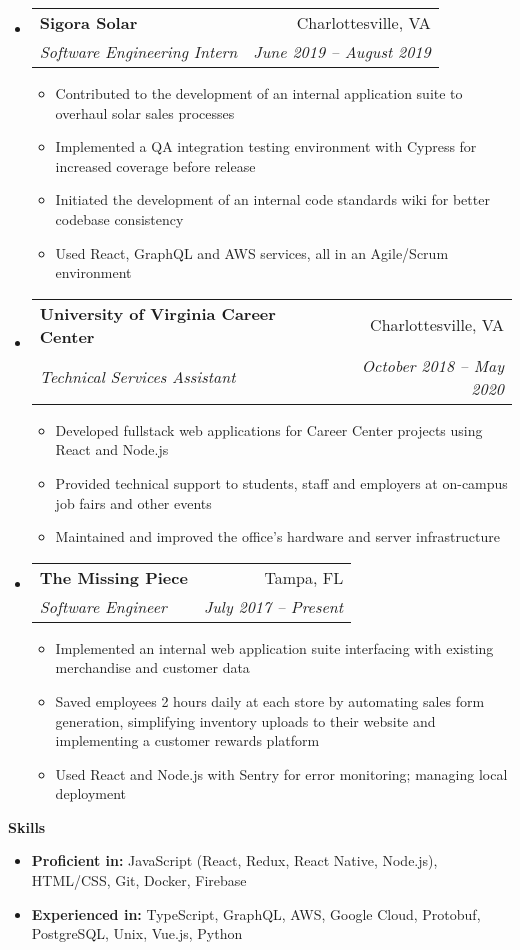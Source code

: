 \documentclass[letterpaper,12pt]{article}[leftmargin=*]
\makeatletter
\def \entryspacing {-0pt}
\renewcommand{\section}[2]{\vspace{5pt}
  \colorbox{secondary}{\color{white}\raggedbottom\normalsize\textbf{{#1}{\hspace{7pt}#2}}}
}
\newcommand{\resumeEntryStart}{\begin{itemize}[leftmargin=2.5mm]}
\newcommand{\resumeEntryEnd}{\end{itemize}\vspace{\entryspacing}}
\newcommand{\resumeItemListStart}{\begin{itemize}[leftmargin=4.5mm]}
\newcommand{\resumeItemListEnd}{\end{itemize}}
\newcommand{\resumeItem}[1]{
  \item\small{
    {#1 \vspace{-2pt}}
  }
}
\newcommand{\resumeEntryTSDL}[4]{
  \vspace{-1pt}\item[]
    \begin{tabular*}{0.97\textwidth}{l@{\extracolsep{\fill}}r}
      \textbf{\color{primary}#1} & {\firabook\color{accent}\small#2} \\
      \textit{\color{accent}\small#3} & \textit{\color{accent}\small#4} \\
    \end{tabular*}\vspace{-7pt}
}
\newcommand{\resumeEntryS}[2]{
  \item[]\small{
    \textbf{\color{primary}#1} #2\vspace{-6pt}
  }
}
\makeatother
\begin{document}
  \resumeEntryStart
    \resumeEntryTSDL
      {Sigora Solar}
      {Charlottesville, VA}
      {Software Engineering Intern}
      {June 2019 -- August 2019}
    \resumeItemListStart
      \resumeItem {Contributed to the development of an internal application suite to overhaul solar sales processes}
      \resumeItem {Implemented a QA integration testing environment with Cypress for increased coverage before release}
      \resumeItem {Initiated the development of an internal code standards wiki for better codebase consistency}
      \resumeItem {Used React, GraphQL and AWS services, all in an Agile/Scrum environment}
    \resumeItemListEnd
  \resumeEntryEnd

  \resumeEntryStart
    \resumeEntryTSDL
      {University of Virginia Career Center}
      {Charlottesville, VA}
      {Technical Services Assistant}
      {October 2018 -- May 2020}
    \resumeItemListStart
      \resumeItem {Developed fullstack web applications for Career Center projects using React and Node.js}
      \resumeItem {Provided technical support to students, staff and employers at on-campus job fairs and other events}
      \resumeItem {Maintained and improved the office’s hardware and server infrastructure}
    \resumeItemListEnd
  \resumeEntryEnd

  \resumeEntryStart
    \resumeEntryTSDL
      {The Missing Piece}
      {Tampa, FL}
      {Software Engineer}
      {July 2017 -- Present}
    \resumeItemListStart
      \resumeItem {Implemented an internal web application suite interfacing with existing merchandise and customer data}
      \resumeItem {Saved employees 2 hours daily at each store by automating sales form generation, simplifying inventory uploads to their website and implementing a customer rewards platform}
      \resumeItem {Used React and Node.js with Sentry for error monitoring; managing local deployment}
    \resumeItemListEnd
  \resumeEntryEnd

\section{\faGears}{Skills}
  \resumeEntryStart
  \resumeEntryS
    {Proficient in:}
    {JavaScript (React, Redux, React Native, Node.js), HTML/CSS, Git, Docker, Firebase}
  \resumeEntryS
    {Experienced in:}
    {TypeScript, GraphQL, AWS, Google Cloud, Protobuf, PostgreSQL, Unix, Vue.js, Python}
  \resumeEntryEnd
\end{document}
